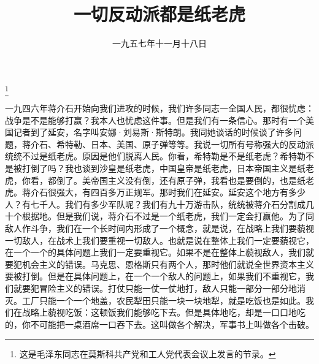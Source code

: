 
\title{一切反动派都是纸老虎}
\date{一九五七年十一月十八日}
\thanks{这是毛泽东同志在莫斯科共产党和工人党代表会议上发言的节录。}
\maketitle


一九四六年蒋介石开始向我们进攻的时候，我们许多同志一全国人民，都很忧虑：战争是不是能够打赢？我本人也忧虑这件事。但是我们有一条信心。那时有一个美国记者到了延安，名字叫安娜·刘易斯·斯特朗。我同她谈话的时候谈了许多问题，蒋介石、希特勒、日本、美国、原子弹等等。我说一切所有号称强大的反动派统统不过是纸老虎。原因是他们脱离人民。你看，希特勒是不是纸老虎？希特勒不是被打倒了吗？我也谈到沙皇是纸老虎，中国皇帝是纸老虎，日本帝国主义是纸老虎，你看，都倒了。美帝国主义没有倒，还有原子弹，我看也是要倒的，也是纸老虎。蒋介石很强大，有四百多万正规军。那时我们在延安。延安这个地方有多少人？有七千人。我们有多少军队呢？我们有九十万游击队，统统被蒋介石分割成几十个根据地。但是我们说，蒋介石不过是一个纸老虎，我们一定会打赢他。为了同敌人作斗争，我们在一个长时间内形成了一个概念，就是说，在战略上我们要藐视一切敌人，在战术上我们要重视一切敌人。也就是说在整体上我们一定要藐视它，在一个一个的具体问题上我们一定要重视它。如果不是在整体上藐视敌人，我们就要犯机会主义的错误。马克思、恩格斯只有两个人，那时他们就说全世界资本主义要被打倒。但是在具体问题上，在一个一个敌人的问题上，如果我们不重视它，我们就要犯冒险主义的错误。打仗只能一仗一仗地打，敌人只能一部分一部分地消灭。工厂只能一个一个地盖，农民犁田只能一块一块地犁，就是吃饭也是如此。我们在战略上藐视吃饭：这顿饭我们能够吃下去。但是具体地吃，却是一口口地吃的，你不可能把一桌酒席一口吞下去。这叫做各个解决，军事书上叫做各个击破。
